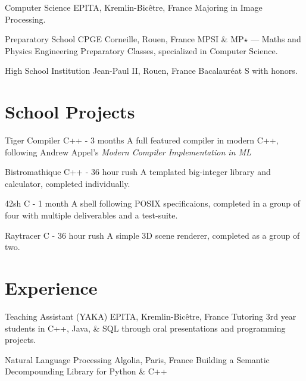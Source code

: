 \documentclass[letterpaper]{twentysecondcv} %
\begin{document}
\begin{twenty} %

    {Computer Science}
    {EPITA, Kremlin-Bicêtre, France}
    {Majoring in Image Processing.}

    {Preparatory School}
    {CPGE Corneille, Rouen, France}
    {MPSI \& MP$\star$ --- Maths and Physics Engineering Preparatory Classes,
    specialized in Computer Science.}

    {High School}
    {Institution Jean-Paul II, Rouen, France}
    {Bacalauréat S with honors.}

\end{twenty}

\section{School Projects}

\begin{twenty}

    {Tiger Compiler}
    {C++ - 3 months}
    {A full featured compiler in modern C++, following Andrew Appel's
    \textit{Modern Compiler Implementation in ML}}

    {Bistromathique}
    {C++ - 36 hour rush}
    {A templated big-integer library and calculator, completed individually.}

    {42sh}
    {C - 1 month}
    {A shell following POSIX specificaions, completed in a group of four
    with multiple deliverables and a test-suite.}

    {Raytracer}
    {C - 36 hour rush}
    {A simple 3D scene renderer, completed as a group of two.}

\end{twenty}


\section{Experience}

\begin{twenty}

    {Teaching Assistant (YAKA)}
    {EPITA, Kremlin-Bicêtre, France}
    {Tutoring 3rd year students in C++, Java, \& SQL through oral presentations
    and programming projects.}

    {Natural Language Processing}
    {Algolia, Paris, France}
    {Building a Semantic Decompounding Library for Python \& C++}

\end{twenty}
\end{document}
